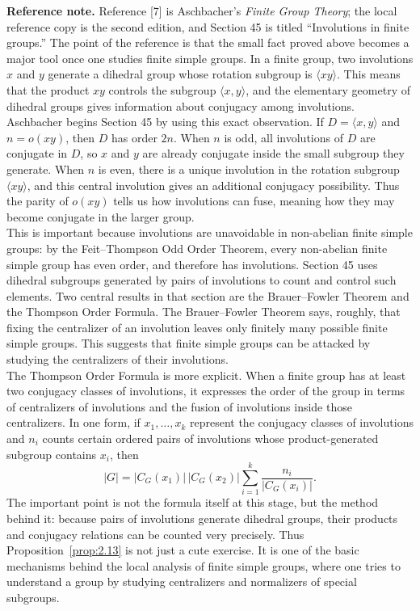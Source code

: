 \documentclass[../Odyssey_Project.tex]{subfiles}
\begin{document}
\noindent\textbf{Reference note.}
Reference [7] is Aschbacher's \emph{Finite Group Theory}; the local reference copy is the second edition, and Section 45 is titled ``Involutions in finite groups.'' The point of the reference is that the small fact proved above becomes a major tool once one studies finite simple groups. In a finite group, two involutions $x$ and $y$ generate a dihedral group whose rotation subgroup is $\langle xy \rangle$. This means that the product $xy$ controls the subgroup $\langle x,y \rangle$, and the elementary geometry of dihedral groups gives information about conjugacy among involutions. \\
Aschbacher begins Section 45 by using this exact observation. If $D = \langle x,y \rangle$ and $n = o(xy)$, then $D$ has order $2n$. When $n$ is odd, all involutions of $D$ are conjugate in $D$, so $x$ and $y$ are already conjugate inside the small subgroup they generate. When $n$ is even, there is a unique involution in the rotation subgroup $\langle xy \rangle$, and this central involution gives an additional conjugacy possibility. Thus the parity of $o(xy)$ tells us how involutions can fuse, meaning how they may become conjugate in the larger group. \\
This is important because involutions are unavoidable in non-abelian finite simple groups: by the Feit--Thompson Odd Order Theorem, every non-abelian finite simple group has even order, and therefore has involutions. Section 45 uses dihedral subgroups generated by pairs of involutions to count and control such elements. Two central results in that section are the Brauer--Fowler Theorem and the Thompson Order Formula. The Brauer--Fowler Theorem says, roughly, that fixing the centralizer of an involution leaves only finitely many possible finite simple groups. This suggests that finite simple groups can be attacked by studying the centralizers of their involutions.\\
The Thompson Order Formula is more explicit. When a finite group has at least two conjugacy classes of involutions, it expresses the order of the group in terms of centralizers of involutions and the fusion of involutions inside those centralizers. In one form, if $x_1,\dots,x_k$ represent the conjugacy classes of involutions and $n_i$ counts certain ordered pairs of involutions whose product-generated subgroup contains $x_i$, then
\[
    |G| = |C_G(x_1)|\,|C_G(x_2)|\sum_{i=1}^k \frac{n_i}{|C_G(x_i)|}.
\]
The important point is not the formula itself at this stage, but the method behind it: because pairs of involutions generate dihedral groups, their products and conjugacy relations can be counted very precisely. Thus Proposition~\ref{prop:2.13} is not just a cute exercise. It is one of the basic mechanisms behind the local analysis of finite simple groups, where one tries to understand a group by studying centralizers and normalizers of special subgroups.
\end{document}
